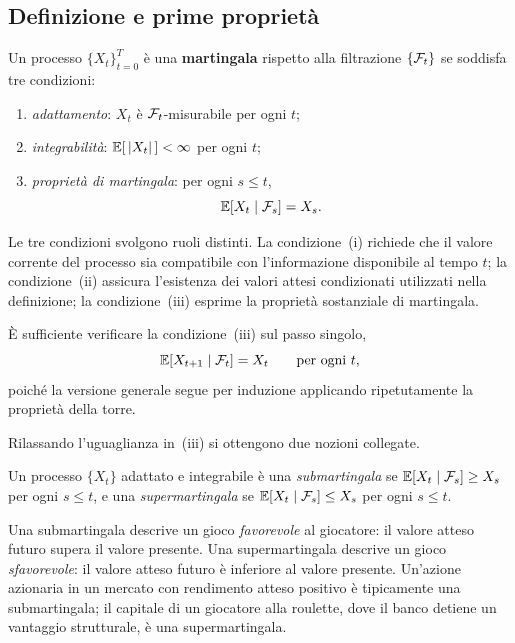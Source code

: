 \subsection{Definizione e prime propriet\`{a}}

\begin{definition}
\label{def:martingala}
Un processo $\{X_t\}_{t=0}^T$ \`{e} una \textbf{martingala}
rispetto alla filtrazione $\{\mathcal{F}_t\}$ se soddisfa tre condizioni:
\begin{enumerate}
\item[(i)] \emph{adattamento}: $X_t$ \`{e} $\mathcal{F}_t$-misurabile
per ogni $t$;
\item[(ii)] \emph{integrabilit\`{a}}: $\mathbb{E}[\,|X_t|\,]<\infty$
per ogni $t$;
\item[(iii)] \emph{propriet\`{a} di martingala}: per ogni
$s\leq t$,
\[
\mathbb{E}[X_t\mid\mathcal{F}_s]=X_s.
\]
\end{enumerate}
\end{definition}

Le tre condizioni svolgono ruoli distinti. La condizione~(i)
richiede che il valore corrente del processo sia compatibile con
l'informazione disponibile al tempo $t$; la condizione~(ii)
assicura l'esistenza dei valori attesi condizionati utilizzati
nella definizione; la condizione~(iii) esprime la propriet\`{a}
sostanziale di martingala.

\begin{remark}
\`{E} sufficiente verificare la condizione~(iii) sul passo
singolo,
\[
\mathbb{E}[X_{t+1}\mid\mathcal{F}_t]=X_t \qquad \text{per ogni } t,
\]
poich\'{e} la versione generale segue per induzione applicando
ripetutamente la propriet\`{a} della torre.
\end{remark}

Rilassando l'uguaglianza in~(iii) si ottengono due nozioni
collegate.

\begin{definition}
\label{def:sub-super}
Un processo $\{X_t\}$ adattato e integrabile \`{e} una
\emph{submartingala} se $\mathbb{E}[X_t\mid\mathcal{F}_s]\geq X_s$ per ogni
$s\leq t$, e una \emph{supermartingala} se
$\mathbb{E}[X_t\mid\mathcal{F}_s]\leq X_s$ per ogni $s\leq t$.
\end{definition}

Una submartingala descrive un gioco \emph{favorevole} al
giocatore: il valore atteso futuro supera il valore presente.
Una supermartingala descrive un gioco \emph{sfavorevole}: il
valore atteso futuro \`{e} inferiore al valore presente.
Un'azione azionaria in un mercato con rendimento atteso positivo
\`{e} tipicamente una submartingala; il capitale di un giocatore
alla roulette, dove il banco detiene un vantaggio strutturale,
\`{e} una supermartingala.


